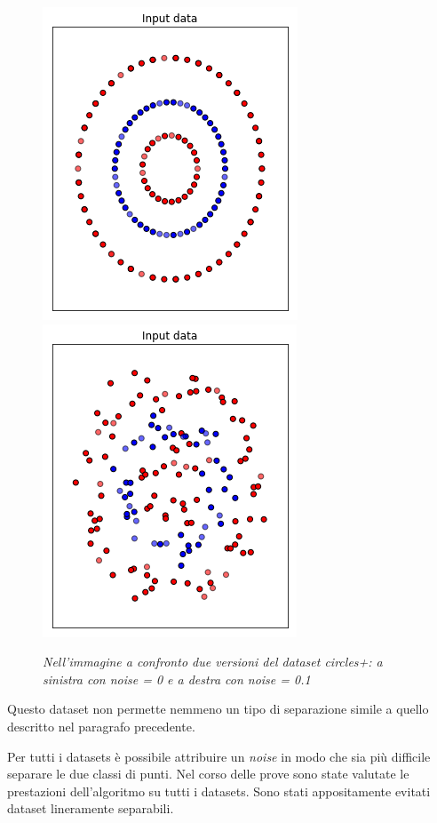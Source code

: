 \documentclass[12pt,a4paper]{report}
\begin{document}
\begin{figure}[H]
 \centering
 \includegraphics[scale = 0.5]{images/circles+_nonoise}
 \includegraphics[scale = 0.5]{images/circles+_noise}
 \caption{\textit {Nell'immagine a confronto due versioni del dataset circles+: a sinistra con noise = 0 e a destra con noise = 0.1 }}
 \label{circles+}
\end{figure}

Questo dataset non permette nemmeno un tipo di separazione simile a quello descritto nel paragrafo precedente.

Per tutti i datasets è possibile attribuire un \textit{noise} in modo che sia più difficile separare le due classi di punti.
Nel corso delle prove sono state valutate le prestazioni dell'algoritmo su tutti i datasets.
Sono stati appositamente evitati dataset lineramente separabili.
\end{document}
